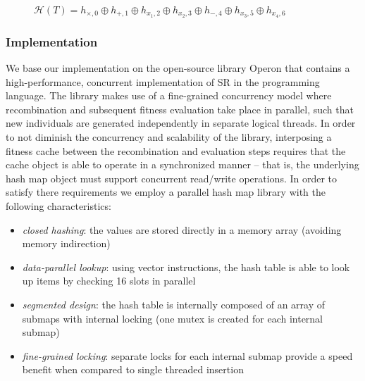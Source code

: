 \documentclass[openacc]{rstransa}%
\begin{document}
\begin{figure}
    \vspace{1.5em}
    \caption{$\mathcal{H}(T) = h_{\times,0} \oplus h_{+, 1} \oplus h_{x_1, 2} \oplus h_{x_2, 3} \oplus h_{-,4} \oplus h_{x_3, 5} \oplus h_{x_4, 6}$}
    \label{fig:zobrist-tree-example}
\end{figure}


\subsubsection*{Implementation}

We base our implementation on the open-source library Operon\cite{burlacu2020} that contains a high-performance, concurrent implementation of SR in the \CPP{} programming language. The library makes use of a fine-grained concurrency model where recombination and subsequent fitness evaluation take place in parallel, such that new individuals are generated independently in separate logical threads. In order to not diminish the concurrency and scalability of the library, interposing a fitness cache between the recombination and evaluation steps requires that the cache object is able to operate in a synchronized manner -- that is, the underlying hash map object must support concurrent read/write operations.
%
In order to satisfy there requirements we employ a parallel hash map library\cite{popovitch2019} with the following characteristics:
\begin{itemize}
    \item \emph{closed hashing}: the values are stored directly in a memory array (avoiding memory indirection)
    \item \emph{data-parallel lookup}: using vector instructions, the hash table is able to look up items by checking 16 slots in parallel
    \item \emph{segmented design}: the hash table is internally composed of an array of submaps with internal locking (one mutex is created for each internal submap)
    \item \emph{fine-grained locking}: separate locks for each internal submap provide a speed benefit when compared to single threaded insertion
\end{itemize}
\end{document}

